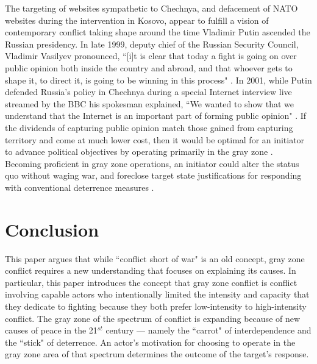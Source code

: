 \documentclass[12pt,letterpaper]{article}
\begin{document}
	The targeting of websites sympathetic to Chechnya, and defacement of NATO websites during the intervention in Kosovo, appear to fulfill a vision of contemporary conflict taking shape around the time Vladimir Putin ascended the Russian presidency. In late 1999, deputy chief of the Russian Security Council, Vladimir Vasilyev pronounced, ``[i]t is clear that today a fight is going on over public opinion both inside the country and abroad, and that whoever gets to shape it, to direct it, is going to be winning in this process" \citep{broadcastingreview1999_1999}. In 2001, while Putin defended Russia’s policy in Chechnya during a special Internet interview live streamed by the BBC his spokesman explained, ``We wanted to show that we understand that the Internet is an important part of forming public opinion" \citep{tyler_talkativeputindemonstrates_2001}. If the dividends of capturing public opinion match those gained from capturing territory and come at much lower cost, then it would be optimal for an initiator to advance political objectives by operating primarily in the gray zone \citep{snegovaya_putininformationwarfare_2015}. Becoming proficient in gray zone operations, an initiator could alter the status quo without waging war, and foreclose target state justifications for responding with conventional deterrence measures \citep{lin_operationaldoctrinehybrid_2015}.
	
\section{Conclusion}
	This paper argues that while ``conflict short of war" is an old concept, gray zone conflict requires a new understanding that focuses on explaining its causes. In particular, this paper introduces the concept that gray zone conflict is conflict involving capable actors who intentionally limited the intensity and capacity that they dedicate to fighting because they both prefer low-intensity to high-intensity conflict. The gray zone of the spectrum of conflict is expanding because of new causes of peace in the 21$^{st}$ century --- namely the ``carrot" of interdependence and the ``stick" of deterrence. An actor's motivation for choosing to operate in the gray zone area of that spectrum determines the outcome of the target's response.
	
\end{document}
